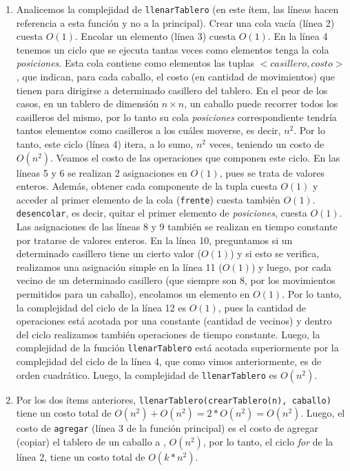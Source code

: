 \begin{enumerate}
  \item Analicemos la complejidad de \verb|llenarTablero| (en este ítem, las líneas hacen referencia a esta función y no a la principal). Crear una cola vacía (línea 2) cuesta $O(1)$. Encolar un elemento (línea 3) cuesta $O(1)$. En la línea 4
  tenemos un ciclo que se ejecuta tantas veces como elementos tenga la cola
  \textit{posiciones}. Esta cola contiene como elementos las tuplas
  $<casillero, costo>$, que indican, para cada caballo, el costo (en cantidad de movimientos) que tienen para dirigirse a determinado casillero del
  tablero. En el peor de los casos, en un tablero de dimensión $n \times n$, un caballo puede recorrer todos los casilleros del mismo, por lo tanto su
  cola \textit{posiciones} correspondiente tendría tantos elementos como casilleros a los cuáles moverse, es decir, $n^2$. Por lo tanto, este ciclo
  (línea 4) itera, a lo sumo, $n^2$ veces, teniendo un costo de $O(n^2)$. Veamos el costo de las operaciones que componen este ciclo.
  En las líneas 5 y 6 se realizan 2 asignaciones en $O(1)$, pues se trata de valores enteros. Además, obtener cada componente de la tupla cuesta $O(1)$ y
  acceder al primer elemento de la cola (\verb|frente|) cuesta también $O(1)$.
  \verb|desencolar|, es decir, quitar el primer elemento de \textit{posiciones}, cuesta $O(1)$. Las asignaciones de las líneas 8 y 9 también se realizan en
  tiempo constante por tratarse de valores enteros. En la línea 10, preguntamos si un determinado casillero tiene un cierto valor ($O(1)$) y si
  esto se verifica, realizamos una asignación simple en la línea 11 ($O(1)$) y
  luego, por cada vecino de un determinado casillero (que siempre son 8, por los movimientos permitidos para un caballo), encolamos un elemento en
  $O(1)$. Por lo tanto, la complejidad del ciclo de la línea 12 es $O(1)$, pues la cantidad de operaciones está acotada por una constante
  (cantidad de vecinos) y dentro del ciclo realizamos también operaciones de tiempo constante. Luego, la complejidad de la función \verb|llenarTablero| está acotada superiormente por la complejidad del ciclo de la línea 4, que como vimos anteriormente, es de orden cuadrático. Luego, la complejidad de
  \verb|llenarTablero| es $O(n^2)$.

  \item Por los dos ítems anteriores,
  \verb|llenarTablero(crearTablero(n), caballo)| tiene un costo total de
  $O(n^2) + O(n^2) = 2*O(n^2) = O(n^2)$. Luego, el costo de \verb|agregar| (línea 3 de la función principal) es el costo de agregar (copiar) el tablero de un caballo a , $O(n^2)$, por lo tanto, el ciclo
  \textit{for} de la línea 2, tiene un costo total de $O(k*n^2)$.


\end{enumerate}
